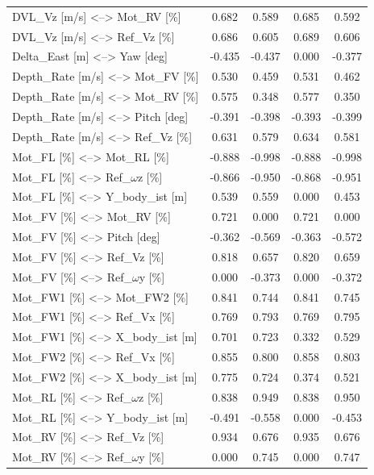 \begin{tabularx}{\textwidth}{|X | cc | cc |}
        DVL\_Vz [m/s] <--> Mot\_RV [\%] & 0.682 & 0.589 & 0.685 & 0.592 \\
        DVL\_Vz [m/s] <--> Ref\_Vz [\%] & 0.686 & 0.605 & 0.689 & 0.606 \\
        Delta\_East [m] <--> Yaw [deg] & -0.435 & -0.437 & 0.000 & -0.377 \\
        Depth\_Rate [m/s] <--> Mot\_FV [\%] & 0.530 & 0.459 & 0.531 & 0.462 \\
        Depth\_Rate [m/s] <--> Mot\_RV [\%] & 0.575 & 0.348 & 0.577 & 0.350 \\
        Depth\_Rate [m/s] <--> Pitch [deg] & -0.391 & -0.398 & -0.393 & -0.399 \\
        Depth\_Rate [m/s] <--> Ref\_Vz [\%] & 0.631 & 0.579 & 0.634 & 0.581 \\
        Mot\_FL [\%] <--> Mot\_RL [\%] & -0.888 & -0.998 & -0.888 & -0.998 \\
        Mot\_FL [\%] <--> Ref\_$\omega$z [\%] & -0.866 & -0.950 & -0.868 & -0.951 \\
        Mot\_FL [\%] <--> Y\_body\_ist [m] & 0.539 & 0.559 & 0.000 & 0.453 \\
        Mot\_FV [\%] <--> Mot\_RV [\%] & 0.721 & 0.000 & 0.721 & 0.000 \\
        Mot\_FV [\%] <--> Pitch [deg] & -0.362 & -0.569 & -0.363 & -0.572 \\
        Mot\_FV [\%] <--> Ref\_Vz [\%] & 0.818 & 0.657 & 0.820 & 0.659 \\
        Mot\_FV [\%] <--> Ref\_$\omega$y [\%] & 0.000 & -0.373 & 0.000 & -0.372 \\
        Mot\_FW1 [\%] <--> Mot\_FW2 [\%] & 0.841 & 0.744 & 0.841 & 0.745 \\
        Mot\_FW1 [\%] <--> Ref\_Vx [\%] & 0.769 & 0.793 & 0.769 & 0.795 \\
        Mot\_FW1 [\%] <--> X\_body\_ist [m] & 0.701 & 0.723 & 0.332 & 0.529 \\
        Mot\_FW2 [\%] <--> Ref\_Vx [\%] & 0.855 & 0.800 & 0.858 & 0.803 \\
        Mot\_FW2 [\%] <--> X\_body\_ist [m] & 0.775 & 0.724 & 0.374 & 0.521 \\
        Mot\_RL [\%] <--> Ref\_$\omega$z [\%] & 0.838 & 0.949 & 0.838 & 0.950 \\
        Mot\_RL [\%] <--> Y\_body\_ist [m] & -0.491 & -0.558 & 0.000 & -0.453 \\
        Mot\_RV [\%] <--> Ref\_Vz [\%] & 0.934 & 0.676 & 0.935 & 0.676 \\
        Mot\_RV [\%] <--> Ref\_$\omega$y [\%] & 0.000 & 0.745 & 0.000 & 0.747 \\

\end{tabularx}
